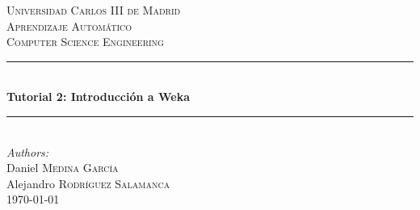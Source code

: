\documentclass[12pt]{article}
\begin{document}
\begin{titlepage}

\newcommand{\HRule}{\rule{\linewidth}{0.5mm}} %

\center %


\textsc{\LARGE Universidad Carlos III de Madrid}\\[1.5cm] %
\textsc{\Large Aprendizaje Automático}\\[0.5cm] %
\textsc{\large Computer Science Engineering}\\[0.5cm] %


\HRule \\[0.4cm]
{ \huge \bfseries Tutorial 2: Introducción a Weka}\\[0.4cm] %
\HRule \\[1.5cm]


\emph{Authors:}\\
Daniel \textsc{Medina García}\\ %
Alejandro \textsc{Rodríguez Salamanca}\\[3cm] %


{\large \today}\\[3cm] %




\vfill %

\end{titlepage}
\end{document}

